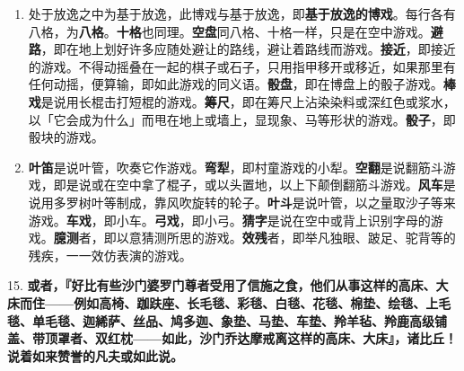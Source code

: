 \begin{enumerate}\item 处于放逸之中为基于放逸，此博戏与基于放逸，即\textbf{基于放逸的博戏}。每行各有八格，为\textbf{八格}。\textbf{十格}也同理。\textbf{空盘}同八格、十格一样，只是在空中游戏。\textbf{避路}，即在地上划好许多应随处避让的路线，避让着路线而游戏。\textbf{接近}，即接近的游戏。不得动摇叠在一起的棋子或石子，只用指甲移开或移近，如果那里有任何动摇，便算输，即如此游戏的同义语。\textbf{骰盘}，即在博盘上的骰子游戏。\textbf{棒戏}是说用长棍击打短棍的游戏。\textbf{筹尺}，即在筹尺上沾染染料或深红色或浆水，以「它会成为什么」而甩在地上或墙上，显现象、马等形状的游戏。\textbf{骰子}，即骰块的游戏。
\item \textbf{叶笛}是说叶管，吹奏它作游戏。\textbf{弯犁}，即村童游戏的小犁。\textbf{空翻}是说翻筋斗游戏，即是说或在空中拿了棍子，或以头置地，以上下颠倒翻筋斗游戏。\textbf{风车}是说用多罗树叶等制成，靠风吹旋转的轮子。\textbf{叶斗}是说叶管，以之量取沙子等来游戏。\textbf{车戏}，即小车。\textbf{弓戏}，即小弓。\textbf{猜字}是说在空中或背上识别字母的游戏。\textbf{臆测}者，即以意猜测所思的游戏。\textbf{效残}者，即举凡独眼、跛足、驼背等的残疾，一一效仿表演的游戏。\end{enumerate}

{\Large 15.} \textbf{或者，『好比有些沙门婆罗门尊者受用了信施之食，他们从事这样的高床、大床而住——例如高椅、跏趺座、长毛毯、彩毯、白毯、花毯、棉垫、绘毯、上毛毯、单毛毯、迦絺萨、丝品、鸠多迦、象垫、马垫、车垫、羚羊毡、羚鹿高级铺盖、带顶罩者、双红枕——如此，沙门乔达摩戒离这样的高床、大床』，诸比丘！说着如来赞誉的凡夫或如此说。}


